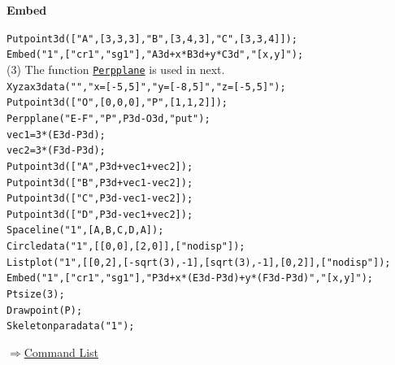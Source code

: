 \documentclass[papersize,a4paper,12pt]{article}
\newenvironment{cmd}[2]{
\hypertarget{#2}{}
\begin{center}{\bf\large #1}\end{center}
\begin{description}
}{
\end{description}
\begin{flushright} \hyperlink{functionlist}{$\Rightarrow$Command List}\end{flushright}
}
\begin{document}
\begin{cmd}{Embed}{embed}
\verb|Putpoint3d(["A",[3,3,3],"B",[3,4,3],"C",[3,3,4]]);|\\
\verb|Embed("1",["cr1","sg1"],"A3d+x*B3d+y*C3d","[x,y]");|\\

(3) The function {\tt \hyperlink{perpplane}{Perpplane}} is used in next.\\
\verb|Xyzax3data("","x=[-5,5]","y=[-8,5]","z=[-5,5]");|\\
\verb|Putpoint3d(["O",[0,0,0],"P",[1,1,2]]);|\\
\verb|Perpplane("E-F","P",P3d-O3d,"put");|\\
\verb|vec1=3*(E3d-P3d);|\\
\verb|vec2=3*(F3d-P3d);|\\
\verb|Putpoint3d(["A",P3d+vec1+vec2]);|\\
\verb|Putpoint3d(["B",P3d+vec1-vec2]);|\\
\verb|Putpoint3d(["C",P3d-vec1-vec2]);|\\
\verb|Putpoint3d(["D",P3d-vec1+vec2]);|\\
\verb|Spaceline("1",[A,B,C,D,A]);|\\
\verb|Circledata("1",[[0,0],[2,0]],["nodisp"]);|\\
\verb|Listplot("1",[[0,2],[-sqrt(3),-1],[sqrt(3),-1],[0,2]],["nodisp"]);|\\
\verb|Embed("1",["cr1","sg1"],"P3d+x*(E3d-P3d)+y*(F3d-P3d)","[x,y]");|\\
\verb|Ptsize(3);|\\
\verb|Drawpoint(P);|\\
\verb|Skeletonparadata("1");|
         \begin{center}  \end{center}
\end{cmd}

\end{document}
